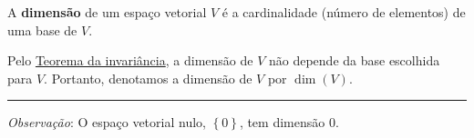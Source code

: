 \begin{definition}
	A \textbf{dimensão} de um espaço vetorial $V$ é a cardinalidade (número de elementos) de uma base de $V$.
	
	Pelo \href{http://mtm.ufsc.br/~cordeiro/ensino/mtm3112.algebra.linear/06.bases/teo_da_invariancia_moodle.html}{Teorema da invariância}, a dimensão de $V$ não depende da base escolhida para $V$. Portanto, denotamos a dimensão de $V$ por $\dim(V)$.
	
	\hrule
	
	\textit{Observação}: O espaço vetorial nulo, $\left\{0\right\}$, tem dimensão $0$.
\end{definition}